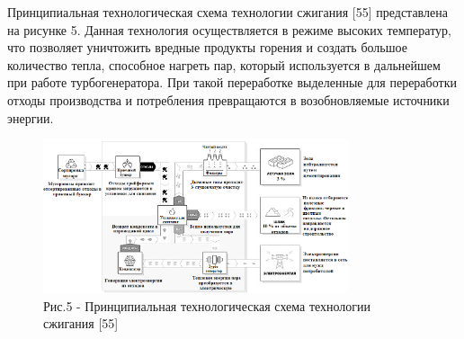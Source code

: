 \begin{multicols}{2}
Принципиальная технологическая схема технологии сжигания {[}55{]}
представлена на рисунке 5. Данная технология осуществляется в режиме
высоких температур, что позволяет уничтожить вредные продукты горения и
создать большое количество тепла, способное нагреть пар, который
используется в дальнейшем при работе турбогенератора. При такой
переработке выделенные для переработки отходы производства и потребления
превращаются в возобновляемые источники энергии.
\end{multicols}

\begin{figure}[H]
	\centering
	\includegraphics[width=0.8\textwidth]{media/chem2/image68}
	\caption*{Рис.5 - Принципиальная технологическая схема технологии сжигания {[}55{]}}
\end{figure}


